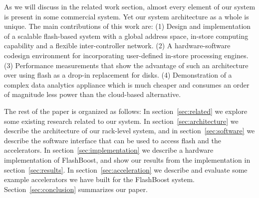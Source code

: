 As we will discuss in the related work section, almost every element of our
system is present in some commercial system. Yet our system architecture as a
whole is unique.  The main contributions of this work are: (1) Design and
implementation of a scalable flash-based system with a global address space,
in-store computing capability and a flexible inter-controller network. (2) A
hardware-software codesign environment for incorporating user-defined in-store
processing engines. (3) Performance measurements that show the advantage of such
an architecture over using flash as a drop-in replacement for disks. (4)
Demonstration of a complex data analytics appliance which is much cheaper and
consumes an order of magnitude less power than the cloud-based alternative.

The rest of the paper is organized as follows: In section~\ref{sec:related} we
explore some existing research related to our system. In
section~\ref{sec:architecture} we describe the architecture of our rack-level
system, and in section~\ref{sec:software} we describe the software interface
that can be used to access flash and the accelerators. In
section~\ref{sec:implementation} we describe a hardware implementation of
FlashBoost, and show our results from the implementation in
section~\ref{sec:results}.  In section~\ref{sec:acceleration} we describe and
evaluate some example accelerators we have built for the FlashBoost system. 
Section~\ref{sec:conclusion} summarizes our paper.



